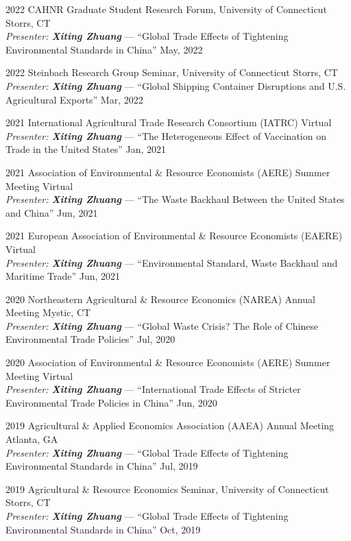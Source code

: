 \documentclass[10.5pt,letterpaper]{article}
\renewenvironment{itemize}{
	\begin{list}{}{
			\setlength{\leftmargin}{1.5em}
		}
	}{
	\end{list}
}
\begin{document}
\begin{itemize}
	\item[-] 2022 CAHNR Graduate Student Research Forum, University of Connecticut \hfill Storrs, CT \\
	\textit{Presenter: \textbf{Xiting Zhuang}} — ``Global Trade Effects of Tightening Environmental Standards in China'' \hfill May, 2022
	
	\item[-] 2022 Steinbach Research Group Seminar, University of Connecticut \hfill Storrs, CT \\
	\textit{Presenter: \textbf{Xiting Zhuang}} — ``Global Shipping Container Disruptions and U.S. Agricultural Exports'' \hfill Mar, 2022
	
	\item[-] 2021 International Agricultural Trade Research Consortium (IATRC) \hfill Virtual \\
	\textit{Presenter: \textbf{Xiting Zhuang}} — ``The Heterogeneous Effect of Vaccination on Trade in the United States'' \hfill Jan, 2021
	
	\item[-] 2021 Association of Environmental \& Resource Economists (AERE) Summer Meeting \hfill Virtual \\
	\textit{Presenter: \textbf{Xiting Zhuang}} — ``The Waste Backhaul Between the United States and China'' \hfill Jun, 2021
	
	\item[-] 2021 European Association of Environmental \& Resource Economists (EAERE) \hfill Virtual \\
	\textit{Presenter: \textbf{Xiting Zhuang}} — ``Environmental Standard, Waste Backhaul and Maritime Trade'' \hfill Jun, 2021
	
	\item[-] 2020 Northeastern Agricultural \& Resource Economics (NAREA) Annual Meeting \hfill Mystic, CT \\
	\textit{Presenter: \textbf{Xiting Zhuang}} — ``Global Waste Crisis? The Role of Chinese Environmental Trade Policies'' \hfill Jul, 2020
	
	\item[-] 2020 Association of Environmental \& Resource Economists (AERE) Summer Meeting \hfill Virtual \\
	\textit{Presenter: \textbf{Xiting Zhuang}} — ``International Trade Effects of Stricter Environmental Trade Policies in China'' \hfill Jun, 2020
	
	\item[-] 2019 Agricultural \& Applied Economics Association (AAEA) Annual Meeting \hfill Atlanta, GA \\
	\textit{Presenter: \textbf{Xiting Zhuang}} — ``Global Trade Effects of Tightening Environmental Standards in China'' \hfill Jul, 2019
	
	\item[-] 2019 Agricultural \& Resource Economics Seminar, University of Connecticut \hfill Storrs, CT \\
	\textit{Presenter: \textbf{Xiting Zhuang}} — ``Global Trade Effects of Tightening Environmental Standards in China'' \hfill Oct, 2019
\end{itemize}
	
\end{document}

